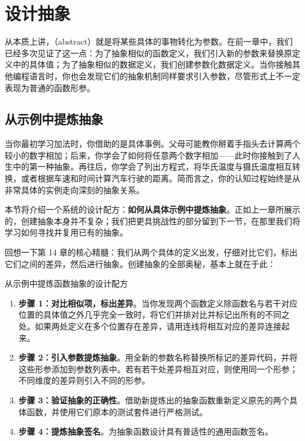 
\chapter{设计抽象}
\label{sec:ch15_abstracting}

从本质上讲，（abstract）就是将某些具体的事物转化为参数。在前一章中，我们已经多次见证了这一点：为了抽象相似的函数定义，我们引入新的参数来替换原定义中的具体值；为了抽象相似的数据定义，我们创建参数化数据定义。当你接触其他编程语言时，你也会发现它们的抽象机制同样要求引入参数，尽管形式上不一定表现为普通的函数形参。

\section{从示例中提炼抽象}
\label{sec:15_1}

当你最初学习加法时，你借助的是具体事例。父母可能教你掰着手指头去计算两个较小的数字相加；后来，你学会了如何将任意两个数字相加——此时你接触到了人生中的第一种抽象。再往后，你学会了列出方程式，将华氏温度与摄氏温度相互转换，或者根据车速和时间计算汽车行驶的距离。简而言之，你的认知过程始终是从非常具体的实例走向深刻的抽象关系。

本节将介绍一个系统的设计配方：\textbf{如何从具体示例中提炼抽象}。正如上一章所展示的，创建抽象本身并不复杂；我们把更具挑战性的部分留到下一节，在那里我们将学习如何寻找并复用已有的抽象。

回想一下第 14 章的核心精髓：我们从两个具体的定义出发，仔细对比它们，标出它们之间的差异，然后进行抽象。创建抽象的全部奥秘，基本上就在于此：

\begin{recipebox}{从示例中提炼函数抽象的设计配方}
\begin{enumerate}
  \item \textbf{步骤 1：对比相似项，标出差异}。当你发现两个函数定义除函数名与若干对应位置的具体值之外几乎完全一致时，将它们并排对比并标记出所有的不同之处。如果两处定义在多个位置存在差异，请用连线将相互对应的差异连接起来。
  \item \textbf{步骤 2：引入参数提炼抽象}。用全新的参数名称替换所标记的差异代码，并将这些形参添加到参数列表中。若有若干处差异相互对应，则使用同一个形参；不同维度的差异则引入不同的形参。
  \item \textbf{步骤 3：验证抽象的正确性}。借助新提炼出的抽象函数重新定义原先的两个具体函数，并使用它们原本的测试套件进行严格测试。
  \item \textbf{步骤 4：提炼抽象签名}。为抽象函数设计具有普适性的通用函数签名。
\end{enumerate}
\end{recipebox}

